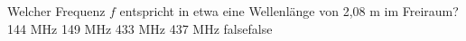     {Welcher Frequenz $f$ entspricht in etwa eine Wellenlänge von 2,08 m im Freiraum?}
    {144 MHz}
    {149 MHz}
    {433 MHz}
    {437 MHz}
    {false}{false}